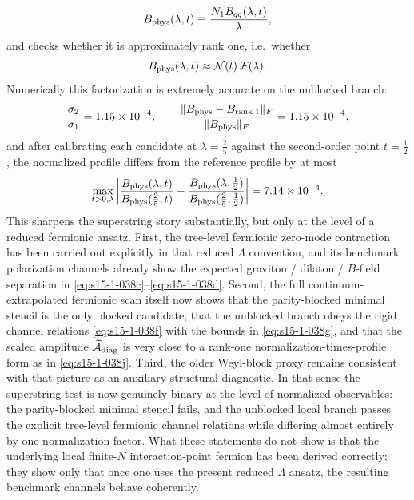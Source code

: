 \documentclass[11pt]{article}
\numberwithin{equation}{section}
\begin{document}
\begin{equation}
\label{eq:s15-1-047}
B_{\rm phys}(\lambda,t)
\equiv
\frac{N_1 B_{qq}(\lambda,t)}{\lambda},
\end{equation}
and checks whether it is approximately rank one, i.e.\ whether
\begin{equation}
\label{eq:s15-1-048}
B_{\rm phys}(\lambda,t)\approx {\cal N}(t)\,{\cal F}(\lambda).
\end{equation}
Numerically this factorization is extremely accurate on the unblocked branch:
\begin{equation}
\label{eq:s15-1-049}
\frac{\sigma_2}{\sigma_1}=1.15\times 10^{-4},
\qquad
\frac{\|B_{\rm phys}-B_{\rm rank\;1}\|_F}{\|B_{\rm phys}\|_F}
=1.15\times 10^{-4},
\end{equation}
and after calibrating each candidate at $\lambda=\frac25$ against the second-order point $t=\frac12$, the normalized profile differs from the reference profile by at most
\begin{equation}
\label{eq:s15-1-050}
\max_{t>0,\lambda}
\left|
\frac{B_{\rm phys}(\lambda,t)}{B_{\rm phys}(\frac25,t)}
-
\frac{B_{\rm phys}(\lambda,\frac12)}{B_{\rm phys}(\frac25,\frac12)}
\right|
=7.14\times 10^{-4}.
\end{equation}
This sharpens the superstring story substantially, but only at the level of a reduced fermionic ansatz. First, the tree-level
fermionic zero-mode contraction has been carried out explicitly in that reduced
$\Lambda$ convention, and its benchmark polarization channels already
show the expected graviton / dilaton / $B$-field separation in
\eqref{eq:s15-1-038c}--\eqref{eq:s15-1-038d}. Second, the full
continuum-extrapolated fermionic scan itself now shows that the parity-blocked
minimal stencil is the only blocked candidate, that the unblocked branch
obeys the rigid channel relations \eqref{eq:s15-1-038f} with the bounds in
\eqref{eq:s15-1-038g}, and that the scaled amplitude
$\widetilde{\cal A}_{\rm diag}$ is very close to a rank-one
normalization-times-profile form as in \eqref{eq:s15-1-038j}. Third, the older
Weyl-block proxy remains consistent with that picture as an auxiliary
structural diagnostic. In that sense the superstring test is now genuinely
binary at the level of normalized observables: the parity-blocked minimal
stencil fails, and the unblocked local branch passes the explicit tree-level
fermionic channel relations while differing almost entirely by one
normalization factor. What these statements do not show is that the underlying local finite-$N$ interaction-point fermion has been derived correctly; they show only that once one uses the present reduced $\Lambda$ ansatz, the resulting benchmark channels behave coherently.
\end{document}

